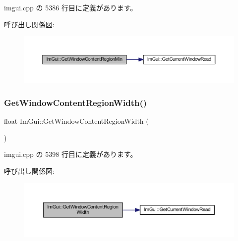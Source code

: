  imgui.\+cpp の 5386 行目に定義があります。

呼び出し関係図\+:\nopagebreak
\begin{figure}[H]
\begin{center}
\leavevmode
\includegraphics[width=350pt]{namespace_im_gui_a790123aa15c266798f35050ba36b7197_cgraph}
\end{center}
\end{figure}
\mbox{\label{namespace_im_gui_a87c1de99e670bff87c43bfb07bbf898f}} 
\subsubsection{\texorpdfstring{Get\+Window\+Content\+Region\+Width()}{GetWindowContentRegionWidth()}}
{\footnotesize\ttfamily float Im\+Gui\+::\+Get\+Window\+Content\+Region\+Width (\begin{DoxyParamCaption}{ }\end{DoxyParamCaption})}



 imgui.\+cpp の 5398 行目に定義があります。

呼び出し関係図\+:\nopagebreak
\begin{figure}[H]
\begin{center}
\leavevmode
\includegraphics[width=350pt]{namespace_im_gui_a87c1de99e670bff87c43bfb07bbf898f_cgraph}
\end{center}
\end{figure}
\mbox{\label{namespace_im_gui_aa100c22a9feafe843fa12c66590cbda0}} 
